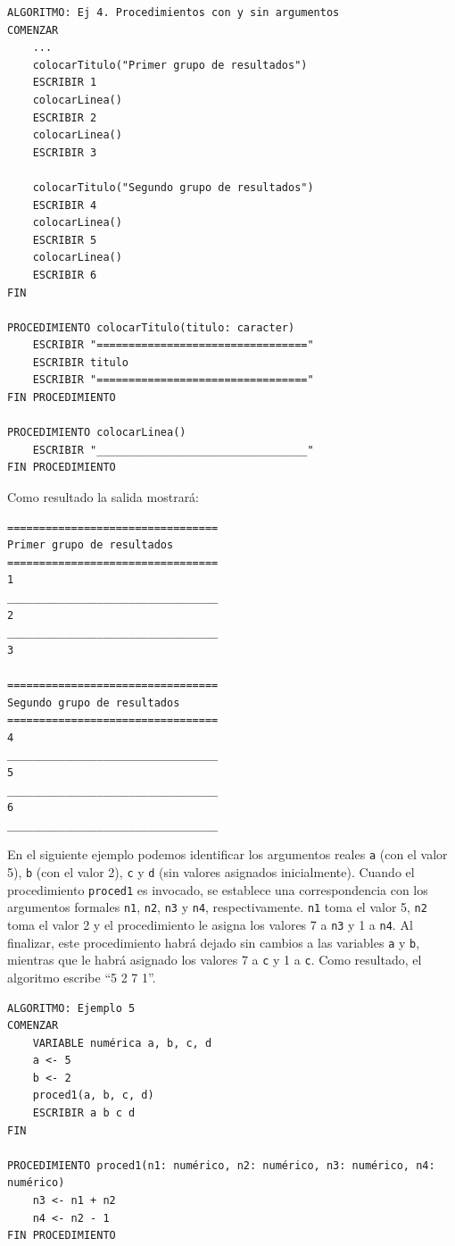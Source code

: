 \documentclass[]{book}
\begin{document}
\begin{verbatim}
ALGORITMO: Ej 4. Procedimientos con y sin argumentos
COMENZAR
    ...
    colocarTitulo("Primer grupo de resultados")
    ESCRIBIR 1
    colocarLinea()
    ESCRIBIR 2
    colocarLinea()
    ESCRIBIR 3

    colocarTitulo("Segundo grupo de resultados")
    ESCRIBIR 4
    colocarLinea()
    ESCRIBIR 5
    colocarLinea()
    ESCRIBIR 6
FIN

PROCEDIMIENTO colocarTitulo(titulo: caracter)
    ESCRIBIR "================================="
    ESCRIBIR titulo
    ESCRIBIR "================================="
FIN PROCEDIMIENTO

PROCEDIMIENTO colocarLinea()
    ESCRIBIR "_________________________________"
FIN PROCEDIMIENTO
\end{verbatim}

Como resultado la salida mostrará:

\begin{verbatim}
=================================
Primer grupo de resultados
=================================
1
_________________________________
2
_________________________________
3

=================================
Segundo grupo de resultados
=================================
4
_________________________________
5
_________________________________
6
_________________________________
\end{verbatim}

En el siguiente ejemplo podemos identificar los argumentos reales
\texttt{a} (con el valor 5), \texttt{b} (con el valor 2), \texttt{c} y
\texttt{d} (sin valores asignados inicialmente). Cuando el procedimiento
\texttt{proced1} es invocado, se establece una correspondencia con los
argumentos formales \texttt{n1}, \texttt{n2}, \texttt{n3} y \texttt{n4},
respectivamente. \texttt{n1} toma el valor 5, \texttt{n2} toma el valor
2 y el procedimiento le asigna los valores 7 a \texttt{n3} y 1 a
\texttt{n4}. Al finalizar, este procedimiento habrá dejado sin cambios a
las variables \texttt{a} y \texttt{b}, mientras que le habrá asignado
los valores 7 a \texttt{c} y 1 a \texttt{c}. Como resultado, el
algoritmo escribe ``5 2 7 1''.

\begin{verbatim}
ALGORITMO: Ejemplo 5
COMENZAR
    VARIABLE numérica a, b, c, d
    a <- 5
    b <- 2
    proced1(a, b, c, d)
    ESCRIBIR a b c d
FIN

PROCEDIMIENTO proced1(n1: numérico, n2: numérico, n3: numérico, n4: numérico)
    n3 <- n1 + n2
    n4 <- n2 - 1
FIN PROCEDIMIENTO
\end{verbatim}
\end{document}
